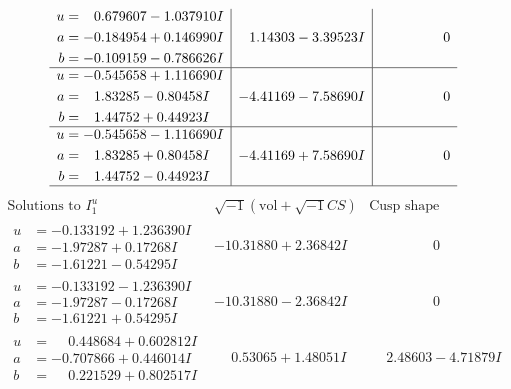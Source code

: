 \documentclass[1p]{elsarticle_modified}
\theoremstyle{definition}
\newcommand{\I}{\sqrt{-1}}
\begin{document}
$$\begin{array}{c|c|c}
\begin{aligned}
u &= \phantom{-}0.679607 - 1.037910 I \\
a &= -0.184954 + 0.146990 I \\
b &= -0.109159 - 0.786626 I\end{aligned}
 & \phantom{-}1.14303 - 3.39523 I & \phantom{-0.000000 } 0 \\ \hline\begin{aligned}
u &= -0.545658 + 1.116690 I \\
a &= \phantom{-}1.83285 - 0.80458 I \\
b &= \phantom{-}1.44752 + 0.44923 I\end{aligned}
 & -4.41169 - 7.58690 I & \phantom{-0.000000 } 0 \\ \hline\begin{aligned}
u &= -0.545658 - 1.116690 I \\
a &= \phantom{-}1.83285 + 0.80458 I \\
b &= \phantom{-}1.44752 - 0.44923 I\end{aligned}
 & -4.41169 + 7.58690 I & \phantom{-0.000000 } 0\\
 \hline 
 \end{array}$$\newpage$$\begin{array}{c|c|c}  
\text{Solutions to }I^u_{1}& \I (\text{vol} + \sqrt{-1}CS) & \text{Cusp shape}\\
 \hline 
\begin{aligned}
u &= -0.133192 + 1.236390 I \\
a &= -1.97287 + 0.17268 I \\
b &= -1.61221 - 0.54295 I\end{aligned}
 & -10.31880 + 2.36842 I & \phantom{-0.000000 } 0 \\ \hline\begin{aligned}
u &= -0.133192 - 1.236390 I \\
a &= -1.97287 - 0.17268 I \\
b &= -1.61221 + 0.54295 I\end{aligned}
 & -10.31880 - 2.36842 I & \phantom{-0.000000 } 0 \\ \hline\begin{aligned}
u &= \phantom{-}0.448684 + 0.602812 I \\
a &= -0.707866 + 0.446014 I \\
b &= \phantom{-}0.221529 + 0.802517 I\end{aligned}
 & \phantom{-}0.53065 + 1.48051 I & \phantom{-}2.48603 - 4.71879 I \\ \hline\begin{aligned}

\end{aligned}
\end{array}$$
\end{document}
